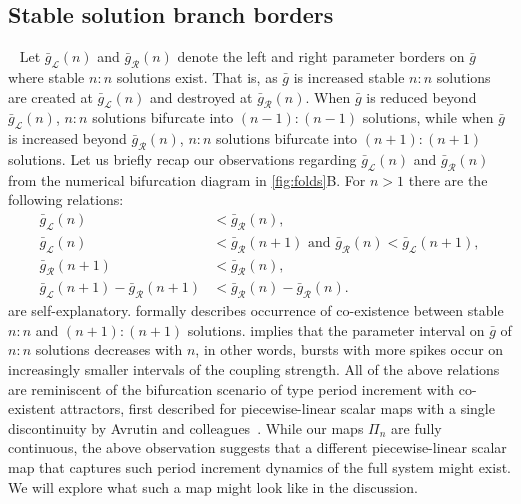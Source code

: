 \subsection{Stable solution branch borders}
~\label{sec:borders}
Let $\bar g_{\mathcal{L}}(n)$ and $\bar g_{\mathcal{R}}(n)$ denote the left and right parameter borders on $\bar g$ where stable $n:n$ solutions exist.
That is, as $\bar g$ is increased stable $n:n$ solutions are created at $\bar g_{\mathcal{L}}(n)$ and destroyed at $\bar g_{\mathcal{R}}(n)$.
When $\bar g$ is reduced beyond $\bar g_{\mathcal{L}}(n)$, $n:n$ solutions bifurcate into $(n-1):(n-1)$ solutions, while when $\bar g$ is increased beyond $\bar g_{\mathcal{R}}(n)$, $n:n$ solutions bifurcate into $(n+1):(n+1)$ solutions.
Let us briefly recap our observations regarding $\bar g_{\mathcal{L}}(n)$ and $\bar g_{\mathcal{R}}(n)$ from the numerical bifurcation diagram in \cref{fig:folds}B.
For $n>1$ there are the following relations:
\begin{align}
	\bar g_{\mathcal{L}}(n)                               & < \bar g_{\mathcal{R}}(n)\label{eq:easy1},                                                                 \\
	\bar g_{\mathcal{L}}(n)                               & < \bar g_{\mathcal{R}}(n+1)\text{ and } \bar g_{\mathcal{R}}(n)<\bar g_{\mathcal{L}}(n+1)\label{eq:easy2}, \\
	\bar g_{\mathcal{R}}(n+1)                             & < \bar g_{\mathcal{R}}(n)\label{eq:coexistence},                                                           \\
	\bar g_{\mathcal{L}}(n+1) - \bar g_{\mathcal{R}}(n+1) & < \bar g_{\mathcal{R}}(n) - \bar g_{\mathcal{R}}(n)\label{eq:robustness}.
\end{align}
 are self-explanatory.
 formally describes occurrence of co-existence between stable $n:n$ and $(n+1):(n+1)$ solutions.
 implies that the parameter interval on $\bar g$ of $n:n$ solutions decreases with $n$, in other words, bursts with more spikes occur on increasingly smaller intervals of the coupling strength.
All of the above relations are reminiscent of the bifurcation scenario of type period increment with co-existent attractors, first described for piecewise-linear scalar maps with a single discontinuity by Avrutin and colleagues~\cite[e.g.
	see][]{gardini2012,tramontana2012,avrutin2011}.
While our maps $\Pi_n$ are fully continuous, the above observation suggests that a different piecewise-linear scalar map that captures such period increment dynamics of the full system might exist.
We will explore what such a map might look like in the discussion.

